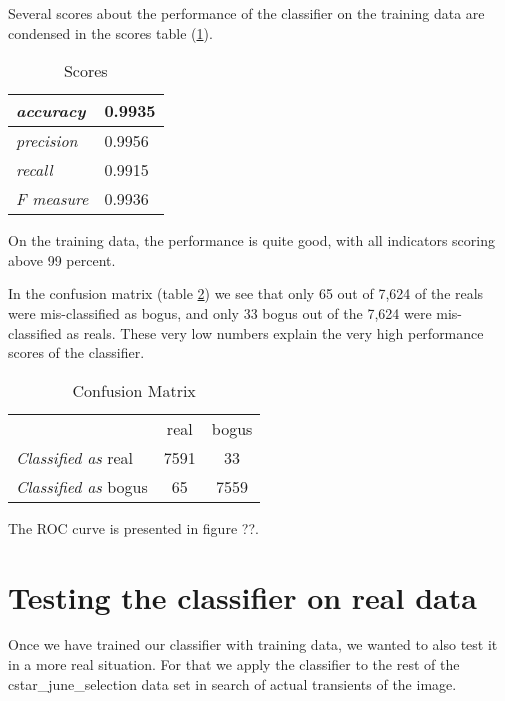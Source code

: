 Several scores about the performance of the classifier on the training data are condensed in the scores table (\ref{mlscores}).

\begin{table}
\centering
\begin{tabular}{| >{\itshape}l | l |}
  \hline
  accuracy & 0.9935 \\ \hline
  precision & 0.9956 \\ \hline
  recall & 0.9915 \\ \hline
  F measure & 0.9936 \\ \hline
\end{tabular}
\caption{Scores}
\label{mlscores}
\end{table}

On the training data, the performance is quite good, with all indicators scoring above 99 percent.

In the confusion matrix (table \ref{mlconfusionmatrix}) we see that only 65 out of 7,624 of the reals were mis-classified as bogus, and only 33 bogus out of the 7,624 were mis-classified as reals. These very low numbers explain the very high performance scores of the classifier.

\begin{table}
\centering
\begin{tabular}{ l|c|c| }
\multicolumn{1}{r}{}
 &  \multicolumn{1}{c}{real}
 & \multicolumn{1}{c}{bogus} \\
\cline{2-3}
{\it Classified as} real & 7591 & 33 \\
\cline{2-3}
{\it Classified as} bogus & 65 & 7559 \\
\cline{2-3}
\end{tabular}
\caption{Confusion Matrix}
\label{mlconfusionmatrix}
\end{table}

The ROC curve is presented in figure ??.

\section{Testing the classifier on real data}

Once we have trained our classifier with training data, we wanted to also test it in a more real situation. For that we apply the classifier to the rest of the cstar\_june\_selection data set in search of actual transients of the image.

\begin{comment}
	* Our test-drive with OIS + ML. Results of paper (hopefully)
		* Test data we used (CSTAR)
		* Processing our raw data (selecting images for a dataset, cleaning images, fixing headers, performing subtractions, identifying sources in subtractions, stamps)
		* Getting samples for training (labeling data as RB, winnow, first run of ML)
		* Feature exploration of data (SExtractor features, derived features, morphological features like Zernike, Chebyshev, Fourier, etc.)
		* Random Forest + SMOTE + Cost Matrix (how well did this perform?)
		* Is it reproducible in other data sets?
\end{comment}



